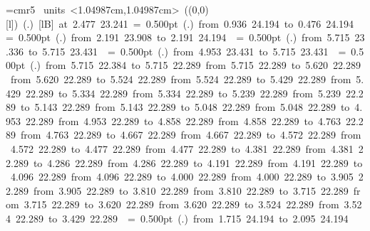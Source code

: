 \font\thinlinefont=cmr5
%
\begingroup\makeatletter\ifx\SetFigFont\undefined%
\gdef\SetFigFont#1#2#3#4#5{%
  \reset@font\fontsize{#1}{#2pt}%
  \fontfamily{#3}\fontseries{#4}\fontshape{#5}%
  \selectfont}%
\fi\endgroup%
\mbox{\beginpicture
\setcoordinatesystem units <1.04987cm,1.04987cm>
\unitlength=1.04987cm
\linethickness=1pt
\setplotsymbol ({\makebox(0,0)[l]{\tencirc{}}})
\setshadesymbol ({\thinlinefont .})
\setlinear
%
%
 [lB] at  2.477 23.241
%
%
\linethickness= 0.500pt
\setplotsymbol ({\thinlinefont .})
{\color[rgb]{0,0,0}\putrule from  0.936 24.194 to  0.476 24.194
}%
%
%
\linethickness= 0.500pt
\setplotsymbol ({\thinlinefont .})
{\color[rgb]{0,0,0}\putrule from  2.191 23.908 to  2.191 24.194
}%
%
%
\linethickness= 0.500pt
\setplotsymbol ({\thinlinefont .})
{\color[rgb]{0,0,0}\putrule from  5.715 23.336 to  5.715 23.431
}%
%
%
\linethickness= 0.500pt
\setplotsymbol ({\thinlinefont .})
{\color[rgb]{0,0,0}\putrule from  4.953 23.431 to  5.715 23.431
}%
%
%
\linethickness= 0.500pt
\setplotsymbol ({\thinlinefont .})
{\color[rgb]{0,0,0}\putrule from  5.715 22.384 to  5.715 22.289
\putrule from  5.715 22.289 to  5.620 22.289
\putrule from  5.620 22.289 to  5.524 22.289
\putrule from  5.524 22.289 to  5.429 22.289
\putrule from  5.429 22.289 to  5.334 22.289
\putrule from  5.334 22.289 to  5.239 22.289
\putrule from  5.239 22.289 to  5.143 22.289
\putrule from  5.143 22.289 to  5.048 22.289
\putrule from  5.048 22.289 to  4.953 22.289
\putrule from  4.953 22.289 to  4.858 22.289
\putrule from  4.858 22.289 to  4.763 22.289
\putrule from  4.763 22.289 to  4.667 22.289
\putrule from  4.667 22.289 to  4.572 22.289
\putrule from  4.572 22.289 to  4.477 22.289
\putrule from  4.477 22.289 to  4.381 22.289
\putrule from  4.381 22.289 to  4.286 22.289
\putrule from  4.286 22.289 to  4.191 22.289
\putrule from  4.191 22.289 to  4.096 22.289
\putrule from  4.096 22.289 to  4.000 22.289
\putrule from  4.000 22.289 to  3.905 22.289
\putrule from  3.905 22.289 to  3.810 22.289
\putrule from  3.810 22.289 to  3.715 22.289
\putrule from  3.715 22.289 to  3.620 22.289
\putrule from  3.620 22.289 to  3.524 22.289
\putrule from  3.524 22.289 to  3.429 22.289
}%
%
%
\linethickness= 0.500pt
\setplotsymbol ({\thinlinefont .})
{\color[rgb]{0,0,0}\putrule from  1.715 24.194 to  2.095 24.194
}}
